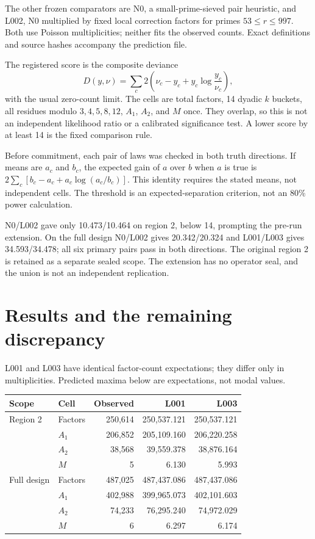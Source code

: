\documentclass[11pt,a4paper]{article}
\begin{document}
The other frozen comparators are N0, a small-prime-sieved pair heuristic,
and L002, N0 multiplied by fixed local correction factors for primes
$53\le r\le997$. Both use Poisson multiplicities; neither fits the observed
counts. Exact definitions and source hashes accompany the prediction file.

The registered score is the composite deviance
\begin{equation}
 D(y,\nu)=\sum_c 2\left(\nu_c-y_c+y_c\log\frac{y_c}{\nu_c}\right),
\end{equation}
with the usual zero-count limit. The cells are total factors, 14 dyadic
$k$ buckets, all residues modulo $3,4,5,8,12$, $A_1$, $A_2$, and $M$ once.
They overlap, so this is not an independent likelihood ratio or a calibrated
significance test. A lower score by at least 14 is the fixed comparison rule.

Before commitment, each pair of laws was checked in both truth directions.
If means are $a_c$ and $b_c$, the expected gain of $a$ over $b$ when $a$ is
true is $2\sum_c[b_c-a_c+a_c\log(a_c/b_c)]$. This identity requires the
stated means, not independent cells. The threshold is an expected-separation
criterion, not an 80\% power calculation.

N0/L002 gave only 10.473/10.464 on region 2, below 14, prompting the
pre-run extension. On the full design N0/L002 gives 20.342/20.324 and
L001/L003 gives 34.593/34.478; all six primary pairs pass in both directions.
The original region 2 is retained as a separate sealed scope. The extension
has no operator seal, and the union is not an independent replication.

\newpage
\section{Results and the remaining discrepancy}
L001 and L003 have identical factor-count expectations; they differ only
in multiplicities. Predicted maxima below are expectations, not modal values.

\begin{center}\small
\begin{tabular}{llrrr}
\toprule
Scope & Cell & Observed & L001 & L003\\
\midrule
Region 2 & Factors & 250,614 & 250,537.121 & 250,537.121\\
 & $A_1$ & 206,852 & 205,109.160 & 206,220.258\\
 & $A_2$ & 38,568 & 39,559.378 & 38,876.164\\
 & $M$ & 5 & 6.130 & 5.993\\
\addlinespace
Full design & Factors & 487,025 & 487,437.086 & 487,437.086\\
 & $A_1$ & 402,988 & 399,965.073 & 402,101.603\\
 & $A_2$ & 74,233 & 76,295.240 & 74,972.029\\
 & $M$ & 6 & 6.297 & 6.174\\
\bottomrule
\end{tabular}
\end{center}
\end{document}
